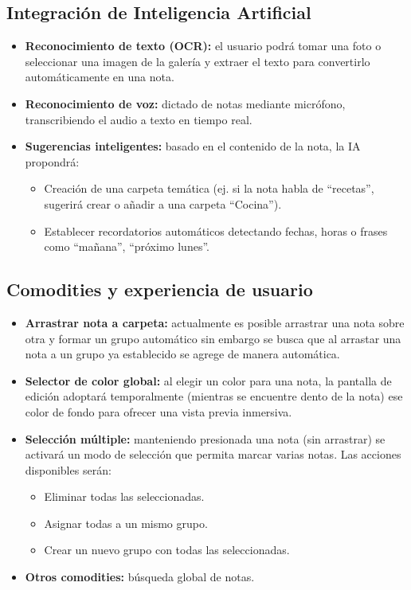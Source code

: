 \documentclass[12pt,a4paper]{article}
\begin{document}
\subsection{Integración de Inteligencia Artificial}
\begin{itemize}
    \item \textbf{Reconocimiento de texto (OCR):} el usuario podrá tomar una foto o seleccionar una imagen de la galería y extraer el texto para convertirlo automáticamente en una nota.
    \item \textbf{Reconocimiento de voz:} dictado de notas mediante micrófono, transcribiendo el audio a texto en tiempo real.
    \item \textbf{Sugerencias inteligentes:} basado en el contenido de la nota, la IA propondrá:
        \begin{itemize}
            \item Creación de una carpeta temática (ej. si la nota habla de “recetas”, sugerirá crear o añadir a una carpeta “Cocina”).
            \item Establecer recordatorios automáticos detectando fechas, horas o frases como “mañana”, “próximo lunes”.
        \end{itemize}
\end{itemize}

\subsection{Comodities y experiencia de usuario}
\begin{itemize}
    \item \textbf{Arrastrar nota a carpeta:} actualmente es posible arrastrar una nota sobre otra y formar un grupo automático sin embargo se busca que al arrastar una nota a un grupo ya establecido se agrege de manera automática.
    \item \textbf{Selector de color global:} al elegir un color para una nota, la pantalla de edición adoptará temporalmente (mientras se encuentre dento de la nota) ese color de fondo para ofrecer una vista previa inmersiva.
    \item \textbf{Selección múltiple:} manteniendo presionada una nota (sin arrastrar) se activará un modo de selección que permita marcar varias notas. Las acciones disponibles serán:
        \begin{itemize}
            \item Eliminar todas las seleccionadas.
            \item Asignar todas a un mismo grupo.
            \item Crear un nuevo grupo con todas las seleccionadas.
        \end{itemize}
    \item \textbf{Otros comodities:} búsqueda global de notas.
\end{itemize}
\end{document}
